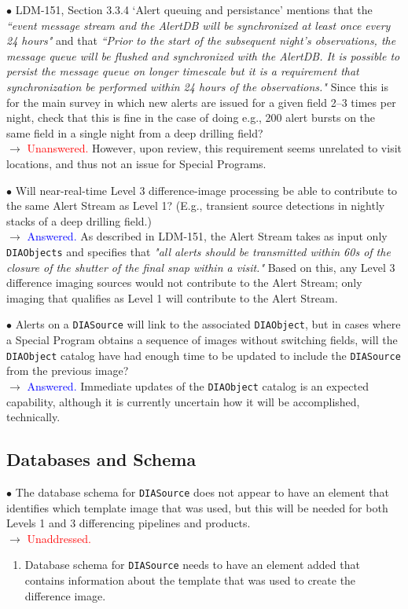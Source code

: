 \documentclass[DM,lsstdraft,toc]{lsstdoc}
\begin{document}
$\bullet$ LDM-151, Section 3.3.4 `Alert queuing and persistance' mentions that the {\it ``event message stream and the AlertDB will be synchronized at least once every 24 hours"} and that {\it ``Prior to the start of the subsequent night's observations, the message queue will be flushed and synchronized with the AlertDB. It is possible to persist the message queue on longer timescale but it is a requirement that synchronization be performed within 24 hours of the observations."} Since this is for the main survey in which new alerts are issued for a given field 2--3 times per night, check that this is fine in the case of doing e.g., 200 alert bursts on the same field in a single night from a deep drilling field? \\
$\rightarrow$  \textcolor{red}{Unanswered.} However, upon review, this requirement seems unrelated to visit locations, and thus not an issue for Special Programs.

$\bullet$ Will near-real-time Level 3 difference-image processing be able to contribute to the same Alert Stream as Level 1? (E.g., transient source detections in nightly stacks of a deep drilling field.) \\
$\rightarrow$ \textcolor{blue}{Answered.} As described in LDM-151, the Alert Stream takes as input only {\tt DIAObjects} and specifies that {\it "all alerts should be transmitted within 60s of the closure of the shutter of the final snap within a visit."} Based on this, any Level 3 difference imaging sources would not contribute to the Alert Stream; only imaging that qualifies as Level 1 will contribute to the Alert Stream.

$\bullet$ Alerts on a {\tt DIASource} will link to the associated {\tt DIAObject}, but in cases where a Special Program obtains a sequence of images without switching fields, will the {\tt DIAObject} catalog have had enough time to be updated to include the {\tt DIASource} from the previous image? \\
$\rightarrow$  \textcolor{blue}{Answered.} Immediate updates of the {\tt DIAObject} catalog is an expected capability, although it is currently uncertain how it will be accomplished, technically. 


\subsection{Databases and Schema}\label{ssec:issues_databases}

$\bullet$ The database schema for {\tt DIASource} does not appear to have an element that identifies which template image that was used, but this will be needed for both Levels 1 and 3 differencing pipelines and products. \\
$\rightarrow$ \textcolor{red}{Unaddressed.}
\begin{enumerate}[resume,topsep=-10pt,label= \textbf{Concern \Roman*.}] \item \label{C8} Database schema for {\tt DIASource} needs to have an element added that contains information about the template that was used to create the difference image. \end{enumerate}
\end{document}
